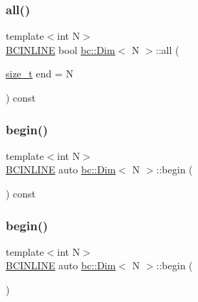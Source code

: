 \subsubsection{\texorpdfstring{all()}{all()}\hspace{0.1cm}{\footnotesize\ttfamily [2/2]}}
{\footnotesize\ttfamily template$<$int N$>$ \\
\hyperlink{common_8h_a6699e8b0449da5c0fafb878e59c1d4b1}{B\+C\+I\+N\+L\+I\+NE} bool \hyperlink{structbc_1_1Dim}{bc\+::\+Dim}$<$ N $>$\+::all (\begin{DoxyParamCaption}\item[{\hyperlink{structbc_1_1Dim_a8c7c7ae0cd96c3923e76097089747290}{size\+\_\+t}}]{end = {\ttfamily N} }\end{DoxyParamCaption}) const\hspace{0.3cm}{\ttfamily [inline]}}

\mbox{\label{structbc_1_1Dim_ad382835256ceedd117733b1676a6bd3e}} 
\subsubsection{\texorpdfstring{begin()}{begin()}\hspace{0.1cm}{\footnotesize\ttfamily [1/2]}}
{\footnotesize\ttfamily template$<$int N$>$ \\
\hyperlink{common_8h_a6699e8b0449da5c0fafb878e59c1d4b1}{B\+C\+I\+N\+L\+I\+NE} auto \hyperlink{structbc_1_1Dim}{bc\+::\+Dim}$<$ N $>$\+::begin (\begin{DoxyParamCaption}{ }\end{DoxyParamCaption}) const\hspace{0.3cm}{\ttfamily [inline]}}

\mbox{\label{structbc_1_1Dim_a6bb6f0694071dbb84f9f65d419a55b01}} 
\subsubsection{\texorpdfstring{begin()}{begin()}\hspace{0.1cm}{\footnotesize\ttfamily [2/2]}}
{\footnotesize\ttfamily template$<$int N$>$ \\
\hyperlink{common_8h_a6699e8b0449da5c0fafb878e59c1d4b1}{B\+C\+I\+N\+L\+I\+NE} auto \hyperlink{structbc_1_1Dim}{bc\+::\+Dim}$<$ N $>$\+::begin (\begin{DoxyParamCaption}{ }\end{DoxyParamCaption})\hspace{0.3cm}{\ttfamily [inline]}}

